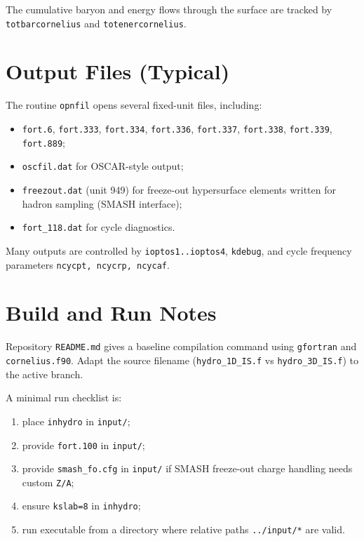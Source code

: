 \documentclass[11pt,a4paper]{article}
\begin{document}
The cumulative baryon and energy flows through the surface are tracked by
\texttt{totbarcornelius} and \texttt{totenercornelius}.

\section{Output Files (Typical)}
The routine \texttt{opnfil} opens several fixed-unit files, including:
\begin{itemize}
\item \texttt{fort.6}, \texttt{fort.333}, \texttt{fort.334}, \texttt{fort.336},
      \texttt{fort.337}, \texttt{fort.338}, \texttt{fort.339}, \texttt{fort.889};
\item \texttt{oscfil.dat} for OSCAR-style output;
\item \texttt{freezout.dat} (unit 949) for freeze-out hypersurface elements
      written for hadron sampling (SMASH interface);
\item \texttt{fort\_118.dat} for cycle diagnostics.
\end{itemize}

Many outputs are controlled by \texttt{ioptos1..ioptos4}, \texttt{kdebug},
and cycle frequency parameters \texttt{ncycpt, ncycrp, ncycaf}.

\section{Build and Run Notes}
Repository \texttt{README.md} gives a baseline compilation command using
\texttt{gfortran} and \texttt{cornelius.f90}. Adapt the source filename
(\texttt{hydro\_1D\_IS.f} vs \texttt{hydro\_3D\_IS.f}) to the active branch.

A minimal run checklist is:
\begin{enumerate}
\item place \texttt{inhydro} in \texttt{input/};
\item provide \texttt{fort.100} in \texttt{input/};
\item provide \texttt{smash\_fo.cfg} in \texttt{input/} if SMASH
      freeze-out charge handling needs custom \texttt{Z/A};
\item ensure \texttt{kslab=8} in \texttt{inhydro};
\item run executable from a directory where relative paths
      \texttt{../input/*} are valid.
\end{enumerate}
\end{document}

